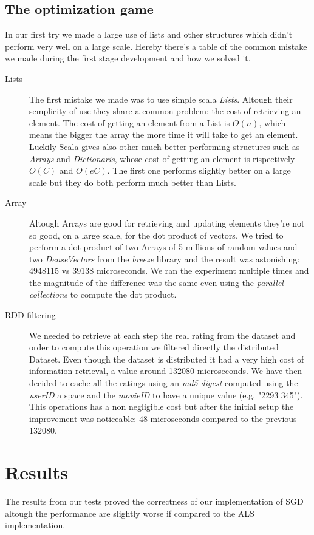 \documentclass{sig-alternate-05-2015}
\begin{document}
\subsection{The optimization game}

In our first try we made a large use of lists and other structures which didn't
perform very well on a large scale. Hereby there's a table of the common mistake
we made during the first stage development and how we solved it.\\
\begin{description}
  \item[Lists] The first mistake we made was to use simple scala \textit{Lists}. Altough their semplicity of use
  they share a common problem: the cost of retrieving an element. The cost of getting an element from a List is $O(n)$,
  which means the bigger the array the more time it will take to get an element. Luckily Scala gives also other much
  better performing structures such as \textit{Arrays} and \textit{Dictionaris}, whose cost of getting an element is rispectively
  $O(C)$ and $O(eC)$. The first one performs slightly better on a large scale but they do both perform much better than Lists.
  \item[Array] Altough Arrays are good for retrieving and updating elements they're not so good, on a large scale, for the dot product of vectors.
  We tried to perform a dot product of two Arrays of 5 millions of random values and two \textit{DenseVectors} from the \textit{breeze} library
  and the result was astonishing: 4948115 vs 39138 microseconds. We ran the experiment multiple times and the magnitude of the difference was the same
  even using the \textit{parallel collections} to compute the dot product.
  \item[RDD filtering] We needed to retrieve at each step the real rating from the dataset and order to compute this operation we filtered
  directly the distributed Dataset. Even though the dataset is distributed it had a very high cost of information retrieval, a value around 132080 microseconds.
  We have then decided to cache all the ratings using an \textit{md5 digest} computed using the \textit{userID} a space and the \textit{movieID} to have
  a unique value (e.g. "2293 345"). This operations has a non negligible cost but after the initial setup the improvement was noticeable: 48 microseconds compared
  to the previous 132080.
\end{description}




\section{Results}
The results from our tests proved the correctness of our implementation of SGD altough the performance are slightly worse if compared to
the ALS implementation.
\end{document}
